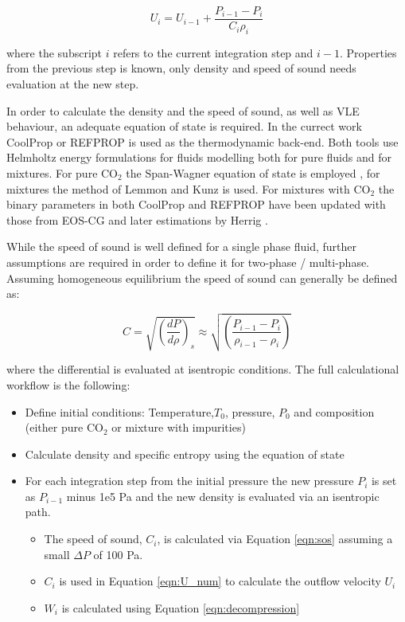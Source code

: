 \documentclass[a4paper, 10pt, twocolumn, twoside]{scrartcl}
\begin{document}
\begin{equation}\label{eqn:U_num}
U_i = U_{i-1} + \frac{P_{i-1}-P_i}{C_i \rho_i}
\end{equation}

where the subscript $i$ refers to the current integration step and $i-1$. Properties from the previous step is known, only density and speed of sound needs evaluation at the new step. 

In order to calculate the density and the speed of sound, as well as VLE behaviour,  an adequate equation of state is required. In the currect work CoolProp \cite{coolprop} or REFPROP \cite{REFPROP} is used as the thermodynamic back-end. Both tools use Helmholtz energy formulations for fluids modelling both for pure fluids and for mixtures. For pure CO$_2$ the Span-Wagner equation of state is employed \cite{Span2009}, for mixtures the method of Lemmon \cite{Lemmon1999} and Kunz \cite{Kunz2012} is used. For mixtures with CO$_2$ the binary parameters in both CoolProp and REFPROP have been updated with those from EOS-CG \cite{Gernert2016} and later estimations by Herrig \cite{Herrig2018}. 

While the speed of sound is well defined for a single phase fluid, further assumptions are required in order to define it for two-phase / multi-phase. Assuming homogeneous equilibrium the speed of sound can generally be defined as:

\begin{equation}\label{eqn:sos}
C = \sqrt{\left( \frac{dP}{d\rho}\right)_s} \approx \sqrt{\left( \frac{P_{i-1} - P_i}{\rho_{i-1}-\rho_i}\right)}
\end{equation}

where the differential is evaluated at isentropic conditions. The full calculational workflow is the following:

\begin{itemize}
	\item Define initial conditions: Temperature,$T_0$, pressure, $P_0$ and composition (either pure CO$_2$ or mixture with impurities)
	\item Calculate density and specific entropy using the equation of state
	\item For each integration step from the initial pressure the new pressure $P_i$ is set as $P_{i-1}$ minus 1e5 Pa and the new density is evaluated via an isentropic path.
	\begin{itemize}
		\item The speed of sound, $C_i$, is calculated via Equation \ref{eqn:sos} assuming a small $\Delta P$ of 100 Pa. 
		\item $C_i$ is used in Equation \ref{eqn:U_num} to calculate the outflow velocity $U_i$
		\item $W_i$ is calculated using Equation \ref{eqn:decompression}
	\end{itemize}
\end{itemize}
\end{document}
